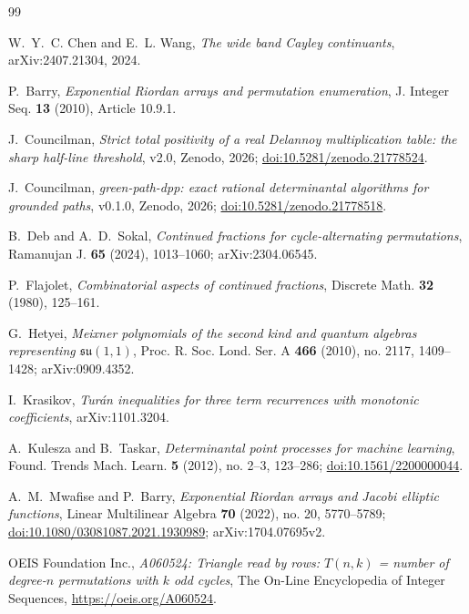 \documentclass[11pt,a4paper]{article}
\theoremstyle{plain}
\theoremstyle{definition}
\theoremstyle{remark}
\begin{document}
\begin{thebibliography}{99}

W.~Y.~C. Chen and E.~L. Wang,
\emph{The wide band Cayley continuants},
arXiv:2407.21304, 2024.

P.~Barry,
\emph{Exponential Riordan arrays and permutation enumeration},
J. Integer Seq. \textbf{13} (2010), Article 10.9.1.

J.~Councilman,
\emph{Strict total positivity of a real Delannoy multiplication table: the sharp
half-line threshold}, v2.0, Zenodo, 2026;
\href{https://doi.org/10.5281/zenodo.21778524}{doi:10.5281/zenodo.21778524}.

J.~Councilman,
\emph{green-path-dpp: exact rational determinantal algorithms for grounded
paths}, v0.1.0, Zenodo, 2026;
\href{https://doi.org/10.5281/zenodo.21778518}{doi:10.5281/zenodo.21778518}.

B.~Deb and A.~D.~Sokal,
\emph{Continued fractions for cycle-alternating permutations},
Ramanujan J. \textbf{65} (2024), 1013--1060; arXiv:2304.06545.

P.~Flajolet,
\emph{Combinatorial aspects of continued fractions},
Discrete Math. \textbf{32} (1980), 125--161.

G.~Hetyei,
\emph{Meixner polynomials of the second kind and quantum algebras representing
$\mathfrak{su}(1,1)$},
Proc. R. Soc. Lond. Ser. A \textbf{466} (2010), no. 2117, 1409--1428;
arXiv:0909.4352.

I.~Krasikov,
\emph{Tur\'an inequalities for three term recurrences with monotonic
coefficients},
arXiv:1101.3204.

A.~Kulesza and B.~Taskar,
\emph{Determinantal point processes for machine learning},
Found. Trends Mach. Learn. \textbf{5} (2012), no. 2--3, 123--286;
\href{https://doi.org/10.1561/2200000044}{doi:10.1561/2200000044}.

A.~M.~Mwafise and P.~Barry,
\emph{Exponential Riordan arrays and Jacobi elliptic functions},
Linear Multilinear Algebra \textbf{70} (2022), no. 20, 5770--5789;
\href{https://doi.org/10.1080/03081087.2021.1930989}{doi:10.1080/03081087.2021.1930989};
arXiv:1704.07695v2.

OEIS Foundation Inc.,
\emph{A060524: Triangle read by rows: $T(n,k)$ = number of degree-$n$
permutations with $k$ odd cycles},
The On-Line Encyclopedia of Integer Sequences,
\url{https://oeis.org/A060524}.


\end{thebibliography}
\end{document}
